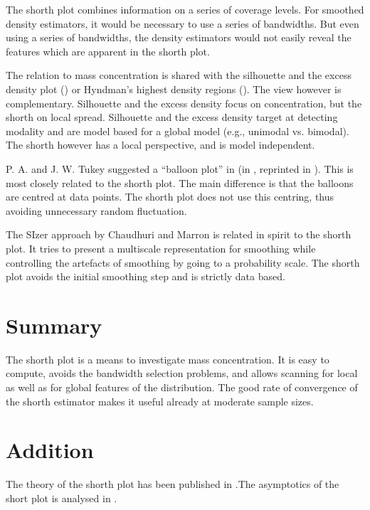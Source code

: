 \documentclass[dvips,12pt,a4paper,twoside]{amsart}
\newcommand{\gsnote}[1]{}
\newcommand{\gsnote}[1]{\marginpar{\textcolor{green}{#1}}}%
\begin{document}
\gsnote{added 20071028}
The shorth plot combines information on a series of coverage levels. For smoothed density estimators, it would be necessary to use a series of bandwidths. But even using  a series of bandwidths, the density estimators would not easily reveal the features which are apparent in the shorth plot.

The relation to mass concentration is shared with the silhouette and the excess density plot  (\cite{dwmgs91jasa}) or Hyndman's highest density regions (\cite{Hyndman1996Computing-and-G}). The view however is complementary. Silhouette and the excess density focus on concentration, but the shorth on local spread. Silhouette and the excess density  target at detecting modality and are model based for a global model (e.g., unimodal vs. bimodal). The shorth however has a local perspective, and is model independent.

P. A. and J. W. Tukey suggested a ``balloon plot'' in \cite{Tukey1981Data-Driven-Vie} (in \cite{Barnett1981Looking-at-mult}, reprinted in \cite{Tukey1988collected-V}). This is most closely related to the shorth plot. The main difference is that the balloons are centred at data points. The shorth plot does not use this centring, thus avoiding unnecessary random fluctuation.

The SIzer approach by Chaudhuri and Marron \cite{Chaudhuri1999SiZer-for-Explo} is related in spirit to the shorth plot. It tries to present a multiscale representation for smoothing while controlling the artefacts of smoothing by going to a probability scale. The shorth plot avoids the initial smoothing step and is strictly data based.



\section{Summary}
The shorth plot is a means to investigate mass concentration. 
It is easy to compute, avoids the bandwidth selection problems, and allows scanning for local as well
as for global features of the distribution. The good rate of convergence of the shorth estimator makes it useful already at moderate sample sizes.

\section{Addition}
The theory of the shorth plot has been published in \cite{egs2010shorthplot}.The asymptotics of the short plot is analysed in \cite{egs2010shorthasymptotics}.
\end{document}
